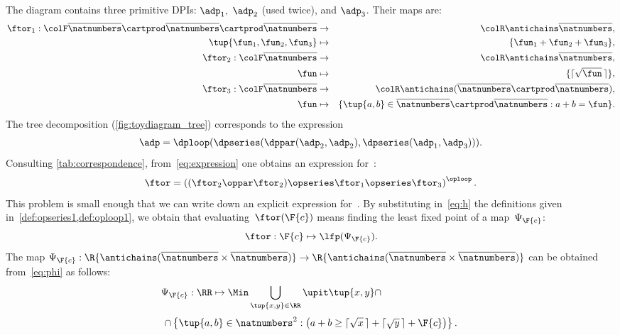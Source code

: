 The diagram contains three primitive DPIs: $\adp_{1},$ $\adp_{2}$ (used twice), and $\adp_{3}$.
Their \ftor maps are:
\begin{eqnarray*}
    \ftor_{1}:{\colF\overline{\natnumbers}\cartprod\overline{\natnumbers}\cartprod\overline{\natnumbers}} & \rightarrow & {\colR\antichains\overline{\natnumbers}},\\
    \tup{ \fun_{1},\fun_{2},\fun_{3}}  & \mapsto & \{\fun_{1}+\fun_{2}+\fun_{3}\},\\
    \ftor_{2}:{\colF\overline{\natnumbers}} & \rightarrow & {\colR\antichains\overline{\natnumbers}},\\
    \fun& \mapsto & \{\lceil\sqrt{\fun}\,\rceil\},\\
    \ftor_{3}:{\colF\overline{\natnumbers}} & \rightarrow & {\colR\antichains(\overline{\natnumbers}\cartprod\overline{\natnumbers})},\\
    \fun& \mapsto & \{\tup{ a,b} \in\overline{\natnumbers}\cartprod\overline{\natnumbers}:a+b=\fun\}.
\end{eqnarray*}
The tree decomposition (\cref{fig:toydiagram_tree}) corresponds to the expression
\begin{equation}
    \adp=\dploop(\dpseries(\dppar(\adp_{2},\adp_{2}),\dpseries(\adp_{1},\adp_{3}))).\label{eq:expression}
\end{equation}
Consulting \cref{tab:correspondence}, from~\cref{eq:expression} one obtains an expression for~\ftor:
\begin{equation}
    \ftor=\left((\ftor_{2}\oppar\ftor_{2})\opseries\ftor_{1}\opseries\ftor_{3}\right)^{\oploop}.\label{eq:h}
\end{equation}
This problem is small enough that we can write down an explicit expression for~\ftor.
By substituting in~\cref{eq:h} the definitions given in~\cref{def:opseries1,def:oploop1}, we obtain that evaluating~$\ftor(\F{c})$ means finding the least fixed point of a map~$\Psi_{\F{c}}$:
\begin{equation*}
    \ftor:\F{c}\mapsto\lfp(\Psi_{\F{c}}).
\end{equation*}
%
The map $\Psi_{\F{c}}:\R{\antichains(\overline{\natnumbers}\times\overline{\natnumbers})}\rightarrow\R{\antichains(\overline{\natnumbers}\times\overline{\natnumbers})}$ can be obtained from~\cref{eq:phi} as follows:
%
\begin{equation}
    \Psi_{\F{c}}:\RR\mapsto\Min\bigcup_{\tup{ x,y} \in\RR}\upit\tup{ x,y} \cap\qquad\qquad\qquad\qquad
\end{equation}
%
\begin{equation}
    \cap\left\{ \tup{ a,b} \in\natnumbers^{2}:\left(a+b\geq\lceil\sqrt{x}\,\rceil+\lceil\sqrt{y}\,\rceil+\F{c}\right)\right\}.
\end{equation}
%

